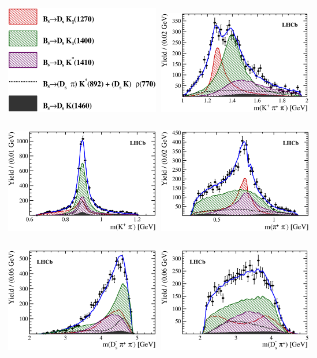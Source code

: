 \begin{figure}[h]
\centering
		\includegraphics[width=0.35\textwidth, height = !]{figs/fullFit/signal_new/leg_mod2.eps} 		
		\includegraphics[width=0.35\textwidth, height = !]{figs/fullFit/signal_new/m_Kpipi_mod2.eps} 	
			
		\includegraphics[width=0.35\textwidth, height = !]{figs/fullFit/signal_new/m_Kpi_mod2.eps} 
		\includegraphics[width=0.35\textwidth, height = !]{figs/fullFit/signal_new/m_pipi_mod2.eps} 
	
		\includegraphics[width=0.35\textwidth, height = !]{figs/fullFit/signal_new/m_Dspipi_mod2.eps} 
		\includegraphics[width=0.35\textwidth, height = !]{figs/fullFit/signal_new/m_Dspi_mod2.eps} 
		

\end{figure}

